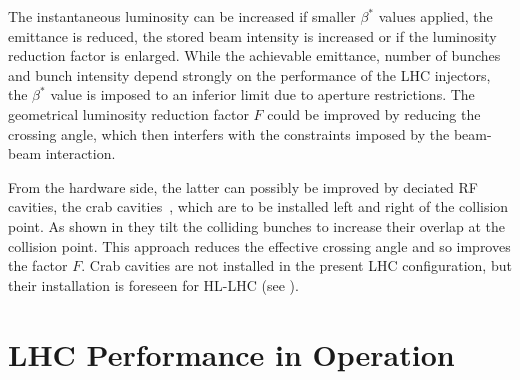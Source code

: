 

%
The instantaneous luminosity can be increased if smaller $\beta^*$ values applied, the emittance is reduced, the stored beam intensity is increased or if the luminosity reduction factor is enlarged. While the achievable emittance, number of bunches and bunch intensity depend strongly on the performance of the LHC injectors, the $\beta^*$ value is imposed to an inferior limit due to aperture restrictions. The geometrical luminosity reduction factor $F$ could be improved by reducing the crossing angle, which then interfers with the constraints imposed by the beam-beam interaction.
%

From the hardware side, the latter can possibly be improved by deciated RF cavities, the crab cavities~\cite{}, which are to be installed left and right of the collision point. As shown in  they tilt the colliding bunches to increase their overlap at the collision point. This approach reduces the effective crossing angle and so improves the factor $F$. Crab cavities are not installed in the present LHC configuration, but their installation is foreseen for HL-LHC (see ).







\section{LHC Performance in Operation} \label{chap:lhccycle}
%

